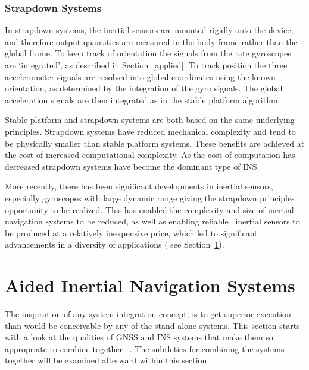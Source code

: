 \documentclass[journal]{IEEEtran}
\begin{document}
%
\subsubsection{Strapdown Systems}
In strapdown systems, the inertial sensors are mounted rigidly onto the device, and therefore output
quantities are measured in the body frame rather than the global frame. To keep track of orientation the
signals from the rate gyroscopes are ‘integrated’, as described in Section~\ref{applied}. To track position the three
accelerometer signals are resolved into global coordinates using the known orientation, as determined by
the integration of the gyro signals. The global acceleration signals are then integrated as in the stable
platform algorithm.

Stable platform and strapdown systems are both based on the same underlying principles. Strapdown
systems have reduced mechanical complexity and tend to be physically smaller than stable platform
systems. These benefits are achieved at the cost of increased computational complexity. As the cost of
computation has decreased strapdown systems have become the dominant type of INS.
 
More recently, there has been significant developments in inertial sensors, especially gyroscopes with large dynamic range giving the strapdown principles opportunity to be realized. This has enabled the complexity and size of inertial navigation systems to be reduced, as well as enabling reliable~\cite{vagner2011mems} inertial sensors to be produced at a relatively inexpensive price, which led to significant advancements in a diversity of applications ( see Section~\ref{components}). 
  


%
\section{Aided Inertial Navigation Systems}\label{components} 
The inspiration of any system integration concept, is to get superior execution than would be conceivable by any of the stand-alone systems. This section starts with a look at the qualities of GNSS and INS systems that make them so appropriate to combine together ~\cite{gade2008introduction}. The  subtleties  for combining the systems together will be examined afterward within this section.
\end{document}
